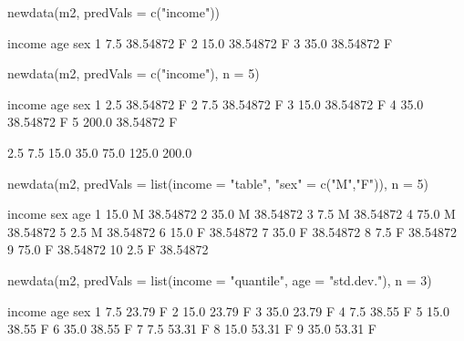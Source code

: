 \begin{Schunk}
\begin{Sinput}
 newdata(m2, predVals = c("income"))
\end{Sinput}
\begin{Soutput}
  income      age sex
1    7.5 38.54872   F
2   15.0 38.54872   F
3   35.0 38.54872   F
\end{Soutput}
\begin{Sinput}
 newdata(m2, predVals = c("income"), n = 5)
\end{Sinput}
\begin{Soutput}
  income      age sex
1    2.5 38.54872   F
2    7.5 38.54872   F
3   15.0 38.54872   F
4   35.0 38.54872   F
5  200.0 38.54872   F
\end{Soutput}
\begin{Soutput}
[1]   2.5   7.5  15.0  35.0  75.0 125.0 200.0
\end{Soutput}
\begin{Sinput}
 newdata(m2, predVals = list(income = "table", "sex" = c("M","F")), n = 5)
\end{Sinput}
\begin{Soutput}
   income sex      age
1    15.0   M 38.54872
2    35.0   M 38.54872
3     7.5   M 38.54872
4    75.0   M 38.54872
5     2.5   M 38.54872
6    15.0   F 38.54872
7    35.0   F 38.54872
8     7.5   F 38.54872
9    75.0   F 38.54872
10    2.5   F 38.54872
\end{Soutput}
\begin{Sinput}
 newdata(m2, predVals = list(income = "quantile", age = "std.dev."), n = 3)
\end{Sinput}
\begin{Soutput}
  income   age sex
1    7.5 23.79   F
2   15.0 23.79   F
3   35.0 23.79   F
4    7.5 38.55   F
5   15.0 38.55   F
6   35.0 38.55   F
7    7.5 53.31   F
8   15.0 53.31   F
9   35.0 53.31   F
\end{Soutput}
\end{Schunk}
